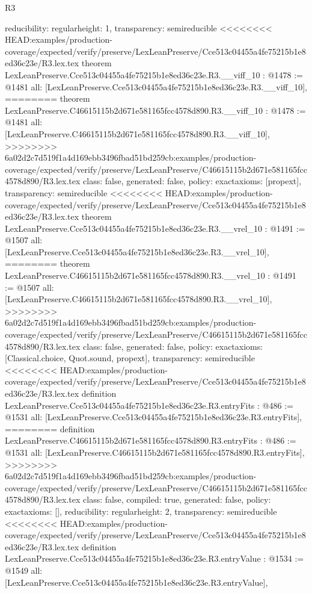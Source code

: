 \begin{lexlean}{R3}
\begin{coremodule}
{{{{{{{{  reducibility: regular{height: 1},
  transparency: semireducible
}
<<<<<<<< HEAD:examples/production-coverage/expected/verify/preserve/LexLeanPreserve/Cce513c04455a4fe75215b1e8ed36c23e/R3.lex.tex
theorem LexLeanPreserve.Cce513c04455a4fe75215b1e8ed36c23e.R3.__viff_10 : @1478 := @1481 {
  all: [LexLeanPreserve.Cce513c04455a4fe75215b1e8ed36c23e.R3.__viff_10],
========
theorem LexLeanPreserve.C46615115b2d671e581165fcc4578d890.R3.__viff_10 : @1478 := @1481 {
  all: [LexLeanPreserve.C46615115b2d671e581165fcc4578d890.R3.__viff_10],
>>>>>>>> 6a02d2c7d519f1a4d169ebb3496fbad51bd259cb:examples/production-coverage/expected/verify/preserve/LexLeanPreserve/C46615115b2d671e581165fcc4578d890/R3.lex.tex
  class: false,
  generated: false,
  policy: exact{axioms: [propext]},
  transparency: semireducible
}
<<<<<<<< HEAD:examples/production-coverage/expected/verify/preserve/LexLeanPreserve/Cce513c04455a4fe75215b1e8ed36c23e/R3.lex.tex
theorem LexLeanPreserve.Cce513c04455a4fe75215b1e8ed36c23e.R3.__vrel_10 : @1491 := @1507 {
  all: [LexLeanPreserve.Cce513c04455a4fe75215b1e8ed36c23e.R3.__vrel_10],
========
theorem LexLeanPreserve.C46615115b2d671e581165fcc4578d890.R3.__vrel_10 : @1491 := @1507 {
  all: [LexLeanPreserve.C46615115b2d671e581165fcc4578d890.R3.__vrel_10],
>>>>>>>> 6a02d2c7d519f1a4d169ebb3496fbad51bd259cb:examples/production-coverage/expected/verify/preserve/LexLeanPreserve/C46615115b2d671e581165fcc4578d890/R3.lex.tex
  class: false,
  generated: false,
  policy: exact{axioms: [Classical.choice, Quot.sound, propext]},
  transparency: semireducible
}
<<<<<<<< HEAD:examples/production-coverage/expected/verify/preserve/LexLeanPreserve/Cce513c04455a4fe75215b1e8ed36c23e/R3.lex.tex
definition LexLeanPreserve.Cce513c04455a4fe75215b1e8ed36c23e.R3.entryFits : @486 := @1531 {
  all: [LexLeanPreserve.Cce513c04455a4fe75215b1e8ed36c23e.R3.entryFits],
========
definition LexLeanPreserve.C46615115b2d671e581165fcc4578d890.R3.entryFits : @486 := @1531 {
  all: [LexLeanPreserve.C46615115b2d671e581165fcc4578d890.R3.entryFits],
>>>>>>>> 6a02d2c7d519f1a4d169ebb3496fbad51bd259cb:examples/production-coverage/expected/verify/preserve/LexLeanPreserve/C46615115b2d671e581165fcc4578d890/R3.lex.tex
  class: false,
  compiled: true,
  generated: false,
  policy: exact{axioms: []},
  reducibility: regular{height: 2},
  transparency: semireducible
}
<<<<<<<< HEAD:examples/production-coverage/expected/verify/preserve/LexLeanPreserve/Cce513c04455a4fe75215b1e8ed36c23e/R3.lex.tex
definition LexLeanPreserve.Cce513c04455a4fe75215b1e8ed36c23e.R3.entryValue : @1534 := @1549 {
  all: [LexLeanPreserve.Cce513c04455a4fe75215b1e8ed36c23e.R3.entryValue],
}}}}}}}}}}}
\end{coremodule}
\end{lexlean}
